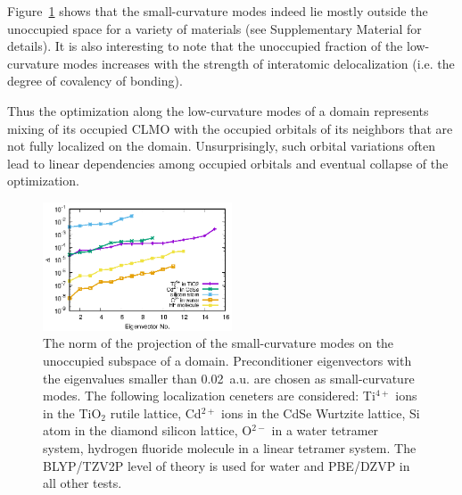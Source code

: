 \documentclass[10pt,amsmath,twocolumn,aps,prl,superscriptaddress,floatfix]{revtex4-1}
\begin{document}
Figure~\ref{fig:projection} shows that the small-curvature modes indeed lie mostly outside the unoccupied space for a variety of materials (see Supplementary Material for details). 
It is also interesting to note that the unoccupied fraction of the low-curvature modes increases with the strength of interatomic delocalization (i.e. the degree of covalency of bonding). 

Thus the optimization along the low-curvature modes of a domain represents mixing of its occupied CLMO with the occupied orbitals of its neighbors that are not fully localized on the domain. 
Unsurprisingly, such orbital variations often lead to linear dependencies among occupied orbitals and eventual collapse of the optimization. 

\begin{figure}
\centering
\includegraphics[width=0.5\textwidth]{residue}
\caption{
The norm of the projection of the small-curvature modes on the unoccupied subspace of a domain. 
Preconditioner eigenvectors with the eigenvalues smaller than 0.02~a.u. are chosen as small-curvature modes. 
The following localization ceneters are considered: Ti$^{4+}$ ions in the TiO$_2$ rutile lattice, Cd$^{2+}$ ions in the CdSe Wurtzite lattice, Si atom in the diamond silicon lattice, O$^{2-}$ in a water tetramer system, hydrogen fluoride molecule in a linear tetramer system. 
The BLYP/TZV2P level of theory is used for water and PBE/DZVP in all other tests.}

\label{fig:projection}
\end{figure}
\end{document}

